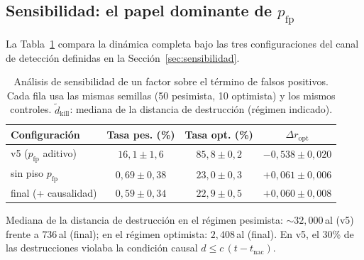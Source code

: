 \documentclass[useAMS,usenatbib,onecolumn]{mn2e}
\begin{document}
\subsection{Sensibilidad: el papel dominante de $p_\text{fp}$}
\label{sec:sens_results}

La Tabla~\ref{tab:sens_pfp} compara la dinámica completa bajo las tres
configuraciones del canal de detección definidas en la
Sección~\ref{sec:sensibilidad}.

\begin{table}
  \centering
  \caption{Análisis de sensibilidad de un factor sobre el término de
           falsos positivos. Cada fila usa las mismas semillas
           (50 pesimista, 10 optimista) y los mismos controles.
           $\tilde{d}_\text{kill}$: mediana de la distancia de
           destrucción (régimen indicado).}
  \label{tab:sens_pfp}
  \begin{tabular}{lccc}
    \toprule
    Configuración & Tasa pes. (\%) & Tasa opt. (\%) & $\Delta r_\text{opt}$ \\
    \midrule
    v5 ($p_\text{fp}$ aditivo)   & $16{,}1 \pm 1{,}6$ & $85{,}8 \pm 0{,}2$ & $-0{,}538 \pm 0{,}020$ \\
    sin piso $p_\text{fp}$        & $0{,}69 \pm 0{,}38$ & $23{,}0 \pm 0{,}3$ & $+0{,}061 \pm 0{,}006$ \\
    final (+ causalidad)          & $0{,}59 \pm 0{,}34$ & $22{,}9 \pm 0{,}5$ & $+0{,}060 \pm 0{,}008$ \\
    \bottomrule
  \end{tabular}
  \begin{flushleft}
    \footnotesize
    Mediana de la distancia de destrucción en el régimen pesimista:
    $\sim 32{,}000$\,al (v5) frente a $736$\,al (final); en el régimen
    optimista: $2{,}408$\,al (final).
    En v5, el 30\% de las destrucciones violaba la condición causal
    $d \leq c\,(t - t_\text{nac})$.
  \end{flushleft}
\end{table}
\end{document}
